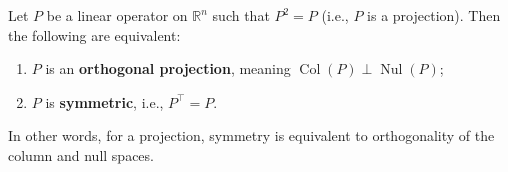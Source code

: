 \newpage

\begin{theorem}
Let \( P \) be a linear operator on \( \mathbb{R}^n \) such that \( P^2 = P \) (i.e., \( P \) is a projection).  
Then the following are equivalent:
\begin{enumerate}
    \item \( P \) is an \textbf{orthogonal projection}, meaning \( \operatorname{Col}(P) \perp \operatorname{Nul}(P) \);
    \item \( P \) is \textbf{symmetric}, i.e., \( P^\top = P \).
\end{enumerate}
In other words, for a projection, symmetry is equivalent to orthogonality of the column and null spaces.
\end{theorem}


